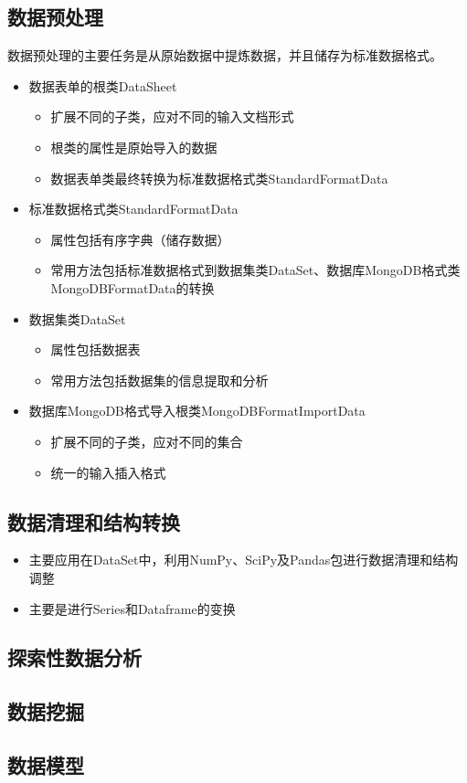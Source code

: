 \documentclass[UTF8,a4paper,10pt]{article}
\begin{document}
\subsection{数据预处理}

数据预处理的主要任务是从原始数据中提炼数据，并且储存为标准数据格式。

\begin{itemize}
  \item 数据表单的根类DataSheet
  \begin{itemize}
    \item 扩展不同的子类，应对不同的输入文档形式
    \item 根类的属性是原始导入的数据
    \item 数据表单类最终转换为标准数据格式类StandardFormatData
  \end{itemize}
  \item 标准数据格式类StandardFormatData
  \begin{itemize}
    \item 属性包括有序字典（储存数据）
    \item 常用方法包括标准数据格式到数据集类DataSet、数据库MongoDB格式类MongoDBFormatData的转换
  \end{itemize}
  \item 数据集类DataSet
  \begin{itemize}
    \item 属性包括数据表
    \item 常用方法包括数据集的信息提取和分析
  \end{itemize}
  \item 数据库MongoDB格式导入根类MongoDBFormatImportData
  \begin{itemize}
    \item 扩展不同的子类，应对不同的集合
    \item 统一的输入插入格式
  \end{itemize}
\end{itemize}


\subsection{数据清理和结构转换}

\begin{itemize}
  \item 主要应用在DataSet中，利用NumPy、SciPy及Pandas包进行数据清理和结构调整
  \item 主要是进行Series和Dataframe的变换
\end{itemize}

\subsection{探索性数据分析}

\subsection{数据挖掘}

\subsection{数据模型}
\end{document}
